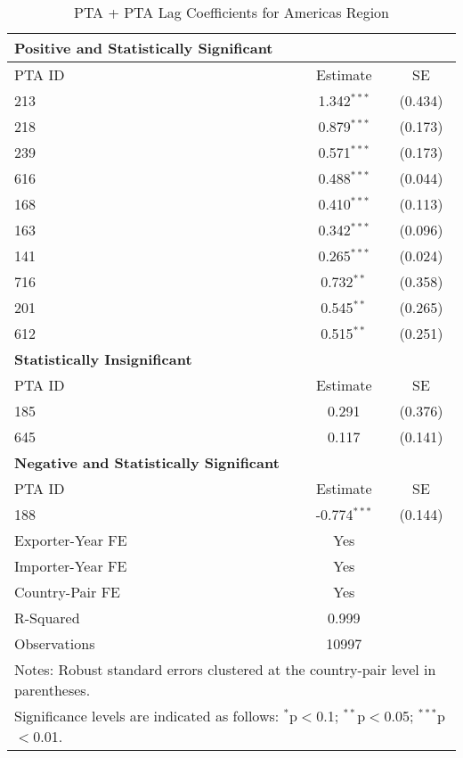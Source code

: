 \begin{table}[htbp]
    \centering
    \caption{PTA + PTA Lag Coefficients for Americas Region}
    \label{tab:pta_americas}
    \begin{adjustbox}{max width=\textwidth}
    \begin{tabular}{lcc}
    \hline
    \textbf{Positive and Statistically Significant} &  &  \\
    \hline
    PTA ID & Estimate & SE \\
    \hline
    213 & 1.342$^{\ast\ast\ast}$ & (0.434) \\
    218 & 0.879$^{\ast\ast\ast}$ & (0.173) \\
    239 & 0.571$^{\ast\ast\ast}$ & (0.173) \\
    616 & 0.488$^{\ast\ast\ast}$ & (0.044) \\
    168 & 0.410$^{\ast\ast\ast}$ & (0.113) \\
    163 & 0.342$^{\ast\ast\ast}$ & (0.096) \\
    141 & 0.265$^{\ast\ast\ast}$ & (0.024) \\
    716 & 0.732$^{\ast\ast}$ & (0.358) \\
    201 & 0.545$^{\ast\ast}$ & (0.265) \\
    612 & 0.515$^{\ast\ast}$ & (0.251) \\
    \hline
    \textbf{Statistically Insignificant} &  &  \\
    \hline
    PTA ID & Estimate & SE \\
    \hline
    185 & 0.291 & (0.376) \\
    645 & 0.117 & (0.141) \\
    \hline
    \textbf{Negative and Statistically Significant} &  &  \\
    \hline
    PTA ID & Estimate & SE \\
    \hline
    188 & -0.774$^{\ast\ast\ast}$ & (0.144) \\
    \hline
    Exporter-Year FE & Yes \\
    Importer-Year FE & Yes \\
    Country-Pair FE & Yes \\
    R-Squared & 0.999 \\
    Observations & 10997 \\
    \hline
    \multicolumn{3}{l}{\footnotesize{Notes: Robust standard errors clustered at the country-pair level in parentheses.}} \\
    \multicolumn{3}{l}{\footnotesize{Significance levels are indicated as follows: $^{\ast}$p$<$0.1; $^{\ast\ast}$p$<$0.05; $^{\ast\ast\ast}$p$<$0.01.}} \\
    \end{tabular}
    \end{adjustbox}
\end{table}
